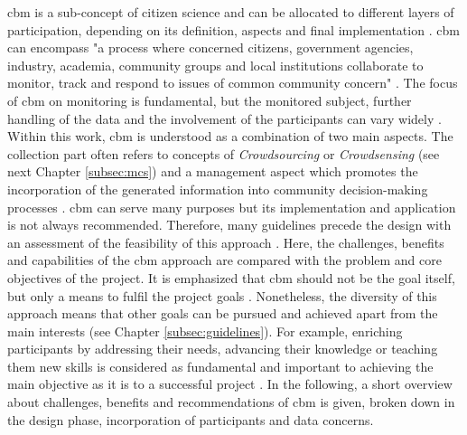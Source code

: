 {\acrfull{cbm} is a sub-concept of citizen science and can be allocated to different layers of participation, depending on its definition, aspects and final implementation \autocite{westonCommunityBasedWaterMonitoring2015}. \acrshort{cbm} can encompass "a process where concerned citizens, government agencies, industry, academia, community groups and local institutions collaborate to monitor, track and respond to issues of common community concern" \autocite[410]{whitelawEstablishingCanadianCommunity2003}. The focus of \acrshort*{cbm} on monitoring is fundamental, but the monitored subject, further handling of the data and the involvement of the participants can vary widely \autocite{baptisteCommunityLedMonitoringWhen2020,conradReviewCitizenScience2011,koehlerCitizenParticipationCollaborative2008,muhamadkhairCommunitybasedMonitoringEnvironmental2021,shirkPublicParticipationScientific2012,westonCommunityBasedWaterMonitoring2015}. Within this work, \acrshort*{cbm} is understood as a combination of two main aspects. The collection part often refers to concepts of \textit{Crowdsourcing} or \textit{Crowdsensing} (see next Chapter \ref{subsec:mcs}) and a management aspect which promotes the incorporation of the generated information into community decision-making processes \autocite{conradCommunitybasedMonitoringScience2007, keoughAchievingIntegrativeCollaborative2006}. 
\acrlong*{cbm} can serve many purposes but its implementation and application is not always recommended. Therefore, many guidelines precede the design with an assessment of the feasibility of this approach \autocite{associationTenPrinciplesCitizen2015,citizenscience.govBasicStepsYour,fraislCitizenScienceEnvironmental2022,minkmanCitizenScienceWater2015, pettiboneCitizenScienceAll2016}. Here, the challenges, benefits and capabilities of the \acrshort*{cbm} approach are compared with the problem and core objectives of the project. It is emphasized that \acrshort*{cbm} should not be the goal itself, but only a means to fulfil the project goals \autocite{minkmanCitizenScienceWater2015}. Nonetheless, the diversity of this approach means that other goals can be pursued and achieved apart from the main interests (see Chapter \ref*{subsec:guidelines}). For example, enriching participants by addressing their needs, advancing their knowledge or teaching them new skills is considered as fundamental and important to achieving the main objective as it is to a successful project \autocite{fraislCitizenScienceEnvironmental2022}. 
In the following, a short overview about challenges, benefits and recommendations of \acrshort*{cbm} is given, broken down in the design phase, incorporation of participants and data concerns.

}
